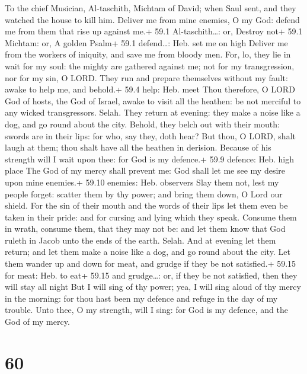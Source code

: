 To the chief Musician, Al-taschith, Michtam of David; when Saul sent,
and they watched the house to kill him.  Deliver me from
mine enemies, O my God: defend me from them that rise up against me.+
59.1 Al-taschith\ldots: or, Destroy not+ 59.1 Michtam: or, A golden
Psalm+ 59.1 defend\ldots: Heb. set me on high  Deliver me
from the workers of iniquity, and save me from bloody men. 
For, lo, they lie in wait for my soul: the mighty are gathered against
me; not for my transgression, nor for my sin, O LORD.  They
run and prepare themselves without my fault: awake to help me, and
behold.+ 59.4 help: Heb. meet  Thou therefore, O LORD God of
hosts, the God of Israel, awake to visit all the heathen: be not
merciful to any wicked transgressors. Selah.  They return at
evening: they make a noise like a dog, and go round about the city.
 Behold, they belch out with their mouth: swords are in
their lips: for who, say they, doth hear?  But thou, O LORD,
shalt laugh at them; thou shalt have all the heathen in derision.
 Because of his strength will I wait upon thee: for God is
my defence.+ 59.9 defence: Heb. high place  The God of my
mercy shall prevent me: God shall let me see my desire upon mine
enemies.+ 59.10 enemies: Heb. observers  Slay them not,
lest my people forget: scatter them by thy power; and bring them down, O
Lord our shield.  For the sin of their mouth and the words
of their lips let them even be taken in their pride: and for cursing and
lying which they speak.  Consume them in wrath, consume
them, that they may not be: and let them know that God ruleth in Jacob
unto the ends of the earth. Selah.  And at evening let them
return; and let them make a noise like a dog, and go round about the
city.  Let them wander up and down for meat, and grudge if
they be not satisfied.+ 59.15 for meat: Heb. to eat+ 59.15 and
grudge\ldots: or, if they be not satisfied, then they will stay all
night  But I will sing of thy power; yea, I will sing aloud
of thy mercy in the morning: for thou hast been my defence and refuge in
the day of my trouble.  Unto thee, O my strength, will I
sing: for God is my defence, and the God of my mercy.

\hypertarget{section-59}{%
\section{60}\label{section-59}}

